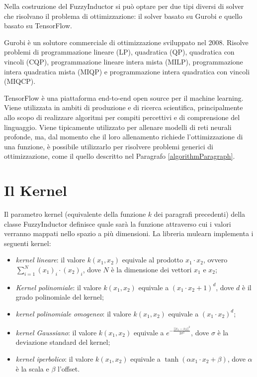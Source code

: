 \documentclass[12pt,a4paper]{report}
\begin{document}
Nella costruzione del FuzzyInductor si può optare per due tipi diversi di solver che risolvano il problema di ottimizzazione: il solver basato su Gurobi e quello basato su TensorFlow. 

Gurobi\cite{gurobi} è un solutore commerciale di ottimizzazione sviluppato nel 2008. Risolve problemi di programmazione lineare (LP), quadratica (QP), quadratica con vincoli (CQP), programmazione lineare intera mista (MILP), programmazione intera quadratica mista (MIQP) e programmazione intera quadratica con vincoli (MIQCP).

TensorFlow \cite{tensorFlow} è una piattaforma end-to-end open source per il machine learning. Viene utilizzata in ambiti di produzione e di ricerca scientifica, principalmente allo scopo di realizzare algoritmi per compiti percettivi e di comprensione del linguaggio. Viene tipicamente utilizzato per allenare modelli di reti neurali profonde, ma, dal momento che il loro allenamento richiede l'ottimizzazione di una funzione, è possibile utilizzarlo per risolvere problemi generici di ottimizzazione, come il quello descritto nel Paragrafo \ref{algorithmParagraph}.

\section{Il Kernel}\label{kernelSection}
Il parametro kernel (equivalente della funzione $k$ dei paragrafi precedenti) della classe FuzzyInductor definisce quale sarà la funzione attraverso cui i valori verranno mappati nello spazio a più dimensioni.
La libreria mulearn implementa i seguenti kernel:

\begin{itemize}
\item \emph{kernel lineare}: il valore $k(x_1,x_2)$ equivale al prodotto $x_1\cdot x_2$, ovvero  $\sum_{i=1}^N(x_1)_i\cdot(x_2)_i$, dove $N$ è la dimensione dei vettori $x_1$ e $x_2$;
\item \emph{Kernel polinomiale}: il valore $k(x_1,x_2)$ equivale a $(x_1\cdot x_2 + 1)^d$, dove $d$ è il grado polinomiale del kernel;
\item \emph{kernel polinomiale omogeneo}:  il valore  $k(x_1,x_2)$ equivale a $(x_1\cdot x_2)^d$;
\item \emph{kernel Gaussiano}:   il valore  $k(x_1,x_2)$ equivale a $e^{-\frac{||x_1 - x_2||^2}{2 \sigma^2}}$, dove $\sigma$ è la deviazione standard del kernel;
\item \emph{kernel iperbolico}:   il valore $k(x_1,x_2)$  equivale a $\tanh(\alpha x_1 \cdot x_2 + \beta)$, dove $\alpha$ è la scala e $\beta$ l'offset.
\end{itemize}
\end{document}
